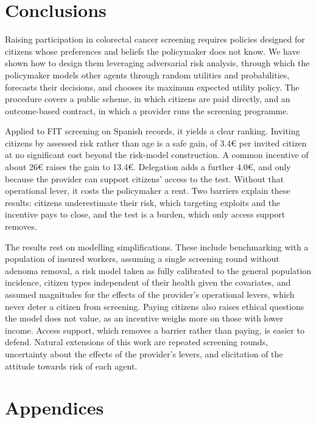 \documentclass[12pt]{article}
\begin{document}
\section{Conclusions} \label{sec:conclusions}
Raising participation in colorectal cancer screening requires policies designed for citizens whose preferences and beliefs the policymaker does not know. We have shown how to design them leveraging adversarial risk analysis, through which the policymaker models other agents through random utilities and probabilities, forecasts their decisions, and chooses its maximum expected utility policy. The procedure covers a public scheme, in which citizens are paid directly, and an outcome-based contract, in which a provider runs the screening programme.

Applied to FIT screening on Spanish records, it yields a clear ranking. Inviting citizens by assessed risk rather than age is a safe gain, of 3.4€ per invited citizen at no significant cost beyond the risk-model construction. A common incentive of about 26€ raises the gain to 13.4€. Delegation adds a further 4.0€, and only because the provider can support citizens' access to the test. Without that operational lever, it costs the policymaker a rent. Two barriers explain these results: citizens underestimate their risk, which targeting exploits and the incentive pays to close, and the test is a burden, which only access support removes.

The results rest on modelling simplifications. These include benchmarking with a population of insured workers, assuming a single screening round without adenoma removal, a risk model taken as fully calibrated to the general population incidence, citizen types independent of their health given the covariates, and assumed magnitudes for the effects of the provider's operational levers, which never deter a citizen from screening. Paying citizens also raises ethical questions the model does not value, as an incentive weighs more on those with lower income. Access support, which removes a barrier rather than paying, is easier to defend. Natural extensions of this work are repeated screening rounds, uncertainty about the effects of the provider's levers, and elicitation of the attitude towards risk of each agent.


\appendix

\section*{Appendices}
\end{document}
